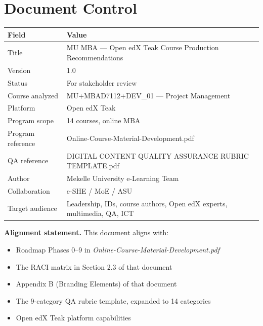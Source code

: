 \chapter*{Document Control}

\begin{longtable}{@{}p{}p{}@{}}
\toprule
\textbf{Field} & \textbf{Value} \\
\midrule
Title & MU MBA — Open edX Teak Course Production Recommendations \\
Version & 1.0 \\
Status & For stakeholder review \\
Course analyzed & MU+MBAD7112+DEV\_01 — Project Management \\
Platform & Open edX Teak \\
Program scope & 14 courses, online MBA \\
Program reference & Online-Course-Material-Development.pdf \\
QA reference & DIGITAL CONTENT QUALITY ASSURANCE RUBRIC TEMPLATE.pdf \\
Author & Mekelle University e-Learning Team \\
Collaboration & e-SHE / MoE / ASU \\
Target audience & Leadership, IDs, course authors, Open edX experts, multimedia, QA, ICT \\
\bottomrule
\end{longtable}

\vspace{1em}

\textbf{Alignment statement.} This document aligns with:
\begin{itemize}
  \item Roadmap Phases 0--9 in \textit{Online-Course-Material-Development.pdf}
  \item The RACI matrix in Section 2.3 of that document
  \item Appendix B (Branding Elements) of that document
  \item The 9-category QA rubric template, expanded to 14 categories
  \item Open edX Teak platform capabilities
\end{itemize}